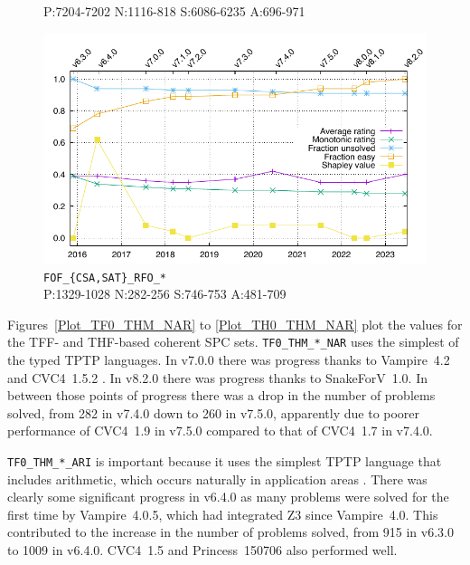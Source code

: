 \documentclass[runningheads]{llncs}
\begin{document}
\begin{figure}[b!]
\begin{minipage}[t]{.49\textwidth}
{           {\scriptsize P:7204-7202 N:1116-818 S:6086-6235 A:696-971}}
  \label{Plot_FOF_THM_RFO}
\end{minipage}
\begin{minipage}[t]{.49\textwidth}
  \centering
  \includegraphics[width=\textwidth]{Plots/GNUPlots/FOF_CSA_SAT_RFO.pdf}
  \vspace*{-2em}
  \caption{{\tt FOF\_\{CSA,SAT\}\_RFO\_*} \\
           {\scriptsize P:1329-1028 N:282-256 S:746-753 A:481-709}}
  \label{Plot_FOF_CSA_SAT_RFO}
\end{minipage}
\end{figure}

Figures~\ref{Plot_TF0_THM_NAR} to \ref{Plot_TH0_THM_NAR} plot the values for the TFF- and
THF-based coherent SPC sets.
{\tt TF0\_THM\_*\_NAR} uses the simplest of the typed TPTP languages.
In v7.0.0 there was progress thanks to Vampire~4.2 and CVC4~1.5.2 \cite{BC+11}.
In v8.2.0 there was progress thanks to SnakeForV~1.0.
In between those points of progress there was a drop in the number of problems solved, from
282 in v7.4.0 down to 260 in v7.5.0, apparently due to poorer performance of CVC4~1.9
in v7.5.0 compared to that of CVC4~1.7 in v7.4.0.

{\tt TF0\_THM\_*\_ARI} is important because it uses the simplest TPTP language that 
includes arithmetic, which occurs naturally in application areas \cite{KK+23,BF+15,PB10}.
There was clearly some significant progress in v6.4.0 as many problems were solved for the
first time by Vampire~4.0.5, which had integrated Z3 \cite{dMB08} since Vampire~4.0.
This contributed to the increase in the number of problems solved, from 915 in v6.3.0 to 1009 
in v6.4.0.
CVC4~1.5 \cite{BC+11} and Princess~150706 \cite{Rue08} also performed well.
\end{document}
